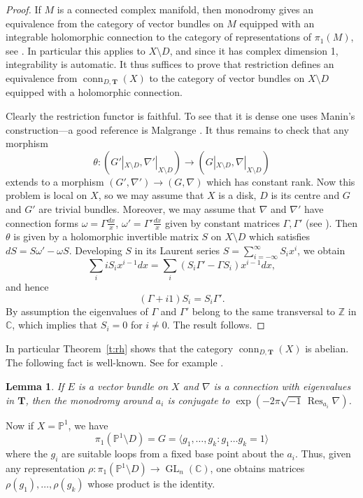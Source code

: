\documentclass{amsart}
\theoremstyle{plain}
\newtheorem{lem}[thm]{Lemma}
\theoremstyle{definition}
\theoremstyle{remark}
\newcommand{\C}{\mathbb{C}}
\newcommand{\Z}{\mathbb{Z}}
\newcommand{\PP}{\mathbb{P}}
\DeclareMathOperator{\GL}{GL}
\DeclareMathOperator{\Res}{Res}
\DeclareMathOperator{\conn}{conn}
\begin{document}
\begin{proof}
If $M$ is a connected complex manifold, then monodromy gives an
equivalence from the category of vector bundles on $M$
equipped with an integrable holomorphic connection to the category of
representations of $\pi_1(M)$, see \cite[\S I.1,I.2]{Deligne}.
In particular this applies to $X\setminus D$, and since it has complex
dimension 1, integrability is automatic. It thus suffices to prove that
restriction defines an equivalence from $\conn_{D,\mathbf{T}}(X)$ to the
category of vector bundles on $X\setminus D$ equipped with a
holomorphic connection.

Clearly the restriction functor is faithful. To see that it is dense one uses Manin's
construction---a good reference is Malgrange \cite[Theorem 4.4]{Malgrange}.
It thus remains to check that any morphism
\[
\theta: (G'|_{X\setminus D},\nabla'|_{X\setminus D})\to (G|_{X\setminus D},\nabla|_{X\setminus D})
\]
extends to a morphism $(G',\nabla')\to (G,\nabla)$ which has constant rank.
Now this problem is local on $X$, so we may assume that $X$ is a disk, $D$ is its centre
and $G$ and $G'$ are trivial bundles.
Moreover, we may assume that $\nabla$ and $\nabla'$ have connection forms $\omega = \Gamma\frac{dx}{x}$,
$\omega' = \Gamma'\frac{dx}{x}$ given by constant matrices $\Gamma,\Gamma'$
(see \cite{Malgrange}). Then $\theta$ is given by a holomorphic invertible matrix $S$ on $X\setminus D$
which satisfies $dS = S\omega'-\omega S$. Developing $S$ in its Laurent series
$S = \sum_{i=-\infty}^\infty S_i x^i$,
we obtain
\[
\sum_i i S_i x^{i-1} dx = \sum_i (S_i \Gamma' - \Gamma S_i) x^{i-1} dx,
\]
and hence
\[
(\Gamma + i1) S_i = S_i \Gamma'.
\]
By assumption the eigenvalues of $\Gamma$ and $\Gamma'$ belong to the same transversal
to $\Z$ in $\C$, which implies that $S_i=0$ for $i\neq 0$. The result follows.
\end{proof}


In particular Theorem~\ref{t:rh} shows that the category $\conn_{D,\mathbf{T}}(X)$
is abelian. The following fact is well-known.
See for example \cite[Proposition 1.4.1]{Haefliger}.


\begin{lem}\label{l:rhconj}
If $E$ is a vector bundle on $X$ and $\nabla$ is a connection
with eigenvalues in $\mathbf{T}$,
then the monodromy around $a_i$ is conjugate to $\exp(-2\pi \sqrt{-1} \, \Res_{a_i}\nabla)$.
\end{lem}


Now if $X=\PP^1$, we have
\[
\pi_1(\PP^1\setminus D) = G = \langle g_1,\dots,g_k : g_1\dots g_k = 1\rangle
\]
where the $g_i$ are suitable loops from a fixed base point about the $a_i$.
Thus, given any representation $\rho:\pi_1(\PP^1\setminus D)\to\GL_n(\C)$, one
obtains matrices $\rho(g_1),\dots,\rho(g_k)$ whose product is the identity.
\end{document}
